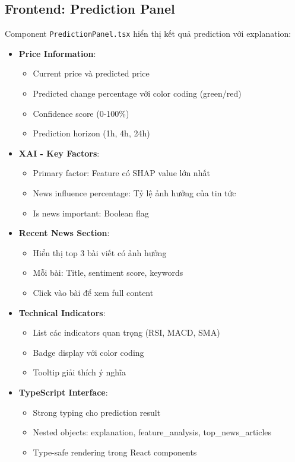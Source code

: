 \subsection{Frontend: Prediction Panel}

Component \texttt{PredictionPanel.tsx} hiển thị kết quả prediction với explanation:

\begin{itemize}
    \item \textbf{Price Information}:
    \begin{itemize}
        \item Current price và predicted price
        \item Predicted change percentage với color coding (green/red)
        \item Confidence score (0-100\%)
        \item Prediction horizon (1h, 4h, 24h)
    \end{itemize}
    
    \item \textbf{XAI - Key Factors}:
    \begin{itemize}
        \item Primary factor: Feature có SHAP value lớn nhất
        \item News influence percentage: Tỷ lệ ảnh hưởng của tin tức
        \item Is news important: Boolean flag
    \end{itemize}
    
    \item \textbf{Recent News Section}:
    \begin{itemize}
        \item Hiển thị top 3 bài viết có ảnh hưởng
        \item Mỗi bài: Title, sentiment score, keywords
        \item Click vào bài để xem full content
    \end{itemize}
    
    \item \textbf{Technical Indicators}:
    \begin{itemize}
        \item List các indicators quan trọng (RSI, MACD, SMA)
        \item Badge display với color coding
        \item Tooltip giải thích ý nghĩa
    \end{itemize}
    
    \item \textbf{TypeScript Interface}:
    \begin{itemize}
        \item Strong typing cho prediction result
        \item Nested objects: explanation, feature\_analysis, top\_news\_articles
        \item Type-safe rendering trong React components
    \end{itemize}
\end{itemize}

